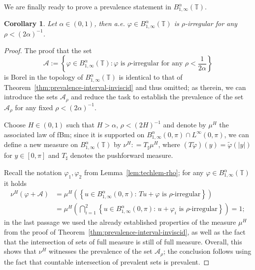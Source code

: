 \documentclass[11pt,oneside,reqno]{amsart}
\newcommand{\assign}{:=}
\newtheorem{corollary}[theorem]{Corollary}
\numberwithin{equation}{section}
\begin{document}
We are finally ready to prove a prevalence statement in $B^{\alpha}_{1,
\infty} (\mathbb{T})$.

\begin{corollary}
  \label{cor:prevalence-periodic-inviscid}Let $\alpha \in (0, 1)$, then a.e.
  $\varphi \in B^{\alpha}_{1, \infty} (\mathbb{T})$ is $\rho$-irregular for
  any $\rho < (2 \alpha)^{- 1}$.
\end{corollary}

\begin{proof}
  The proof that the set
  \[ \mathcal{A} \assign \left\{ \varphi \in B^{\alpha}_{1, \infty}
     (\mathbb{T}) : \varphi \text{ is } \rho \text{-irregular for any } \rho <
     \frac{1}{2 \alpha}  \right\} \]
  is Borel in the topology of $B^{\alpha}_{1, \infty} (\mathbb{T})$ is
  identical to that of Theorem~\ref{thm:prevalence-interval-inviscid} and thus
  omitted; as therein, we can introduce the sets $\mathcal{A}_{\rho}$ and
  reduce the task to establish the prevalence of the set $\mathcal{A}_{\rho}$
  for any fixed $\rho < (2 \alpha)^{- 1}$.
  
  Choose $H \in (0, 1)$ such that $H > \alpha$, $\rho < (2 H)^{- 1}$ and
  denote by $\mu^H$ the associated law of fBm; since it is supported on
  $B^{\alpha}_{1, \infty} (0, \pi) \cap L^{\infty} (0, \pi)$, we can define a
  new measure on $B^{\alpha}_{1, \infty} (\mathbb{T})$ by $\nu^H : =
  T_{\sharp} \mu^H$, where $(T \tilde{\varphi}) (y) = \tilde{\varphi} (| y |)$
  for $y \in [0, \pi]$ and $T_{\sharp}$ denotes the pushforward measure.
  
  Recall the notation $\varphi_1, \varphi_2$ from Lemma~\ref{lem:techlem-rho};
  for any $\varphi \in B^{\alpha}_{1, \infty} (\mathbb{T})$ it holds
%  
  \begin{align*}
    \nu^H (\varphi + \mathcal{A}) & = \mu^H \left( \left\{ u \in
    B^{\alpha}_{1, \infty} (0, \pi) : \, T u + \varphi \text{ is } \rho
    \text{-irregular}  \right\} \right)\\
    & = \mu^H \left( \bigcap_{i = 1}^2 \left\{ u \in B^{\alpha}_{1, \infty}
    (0, \pi) : \, u + \varphi_i \text{ is } \rho \text{-irregular}  \right\}
    \right) = 1 ;
  \end{align*}
%  
  in the last passage we used the already established properties of the
  measure $\mu^H$ from the proof of
  Theorem~\ref{thm:prevalence-interval-inviscid}, as well as the fact that the
  intersection of sets of full measure is still of full measure. Overall, this
  shows that $\nu^H$ witnesses the prevalence of the set $\mathcal{A}_{\rho}$;
  the conclusion follows using the fact that countable intersection of
  prevalent sets is prevalent.
\end{proof}
\end{document}
